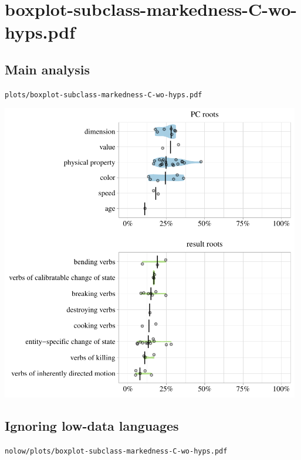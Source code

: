\eject

\section{boxplot-subclass-markedness-C-wo-hyps.pdf}

\subsection{Main analysis}

\texttt{plots/boxplot-subclass-markedness-C-wo-hyps.pdf}

\includegraphics[width=0.98\textwidth]{../plots/boxplot-subclass-markedness-C-wo-hyps.pdf}

\subsection{Ignoring low-data languages}

\texttt{nolow/plots/boxplot-subclass-markedness-C-wo-hyps.pdf}

